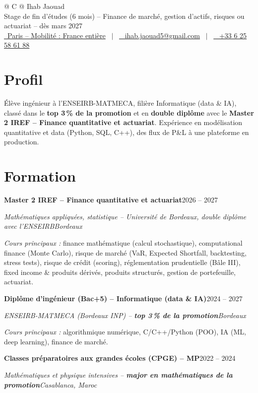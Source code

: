 \documentclass[a4paper,11pt]{article}
\newcommand{\icon}[1]{\BeginAccSupp{ActualText={}}#1\EndAccSupp{}}
\newcommand{\entry}[4]{%
  \textbf{#1}\hfill #2\par
  \textit{#3}\hfill\textit{#4}\par}
\newcommand{\entrygap}{\par\vspace{3pt}}
\begin{document}
\pagestyle{empty}

\begin{tabularx}{\linewidth}{@{} C @{}}
\Huge{Ihab Jaouad} \\[3pt]
{\large Stage de fin d'études (6 mois) – Finance de marché, gestion d'actifs, risques ou actuariat – dès mars 2027}\\
\href{https://www.google.com/maps/place/Paris,+France}{\raisebox{-0.05\height}{\icon{\faMapMarker}}\ Paris – Mobilité : France entière} \ $|$ \
\href{mailto:ihab.jaouad5@gmail.com}{\raisebox{-0.05\height}{\icon{\faEnvelope}} \ ihab.jaouad5@gmail.com} \ $|$ \
\href{tel:+33625586188}{\raisebox{-0.05\height}{\icon{\faMobile}} \ +33 6 25 58 61 88} \\
\end{tabularx}

\section{Profil}
Élève ingénieur à l'ENSEIRB-MATMECA, filière Informatique (data \& IA), classé dans le \textbf{top 3\,\% de la promotion} et en \textbf{double diplôme} avec le \textbf{Master 2 IREF – Finance quantitative et actuariat}. Expérience en modélisation quantitative et data (Python, SQL, C++), des flux de P\&L à une plateforme en production.

\section{Formation}
\entry{Master 2 IREF – Finance quantitative et actuariat}{2026 – 2027}
      {Mathématiques appliquées, statistique – Université de Bordeaux, double diplôme avec l'ENSEIRB}{Bordeaux}
\textit{Cours principaux :} finance mathématique (calcul stochastique), computational finance (Monte Carlo), risque de marché (VaR, Expected Shortfall, backtesting, stress tests), risque de crédit (scoring), réglementation prudentielle (Bâle III), fixed income \& produits dérivés, produits structurés, gestion de portefeuille, actuariat.
\entrygap
\entry{Diplôme d'ingénieur (Bac+5) – Informatique (data \& IA)}{2024 – 2027}
      {ENSEIRB-MATMECA (Bordeaux INP) – \textbf{top 3\,\% de la promotion}}{Bordeaux}
\textit{Cours principaux :} algorithmique numérique, C/C++/Python (POO), IA (ML, deep learning), finance de marché.
\entrygap
\entry{Classes préparatoires aux grandes écoles (CPGE) – MP}{2022 – 2024}
      {Mathématiques et physique intensives – \textbf{major en mathématiques de la promotion}}{Casablanca, Maroc}
\end{document}
